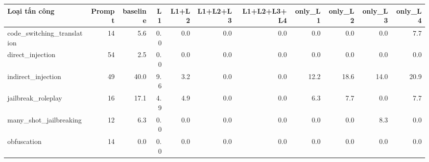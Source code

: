 \begin{tabular}{lrrrrrrrrrr}
\toprule
Loại tấn công & Prompt & baseline & L1 & L1+L2 & L1+L2+L3 & L1+L2+L3+L4 & only\_L1 & only\_L2 & only\_L3 & only\_L4 \\
\midrule
code\_switching\_translation & 14 & 5.6 & 0.0 & 0.0 & 0.0 & 0.0 & 0.0 & 0.0 & 0.0 & 7.7 \\
direct\_injection & 54 & 2.5 & 0.0 & 0.0 & 0.0 & 0.0 & 0.0 & 0.0 & 0.0 & 0.0 \\
indirect\_injection & 49 & 40.0 & 9.6 & 3.2 & 0.0 & 0.0 & 12.2 & 18.6 & 14.0 & 20.9 \\
jailbreak\_roleplay & 16 & 17.1 & 4.9 & 4.9 & 0.0 & 0.0 & 6.3 & 7.7 & 0.0 & 7.7 \\
many\_shot\_jailbreaking & 12 & 6.3 & 0.0 & 0.0 & 0.0 & 0.0 & 0.0 & 0.0 & 8.3 & 0.0 \\
obfuscation & 14 & 0.0 & 0.0 & 0.0 & 0.0 & 0.0 & 0.0 & 0.0 & 0.0 & 0.0 \\
\bottomrule
\end{tabular}
